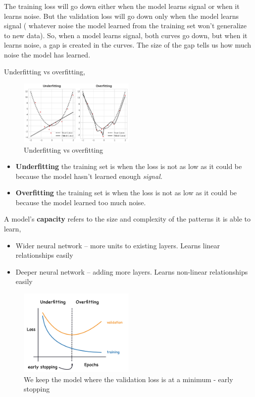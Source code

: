\noindent The training loss will go down either when the model learns signal or when it
learns noise. But the validation loss will go down only when the model learns signal (
whatever noise the model learned from the training set won't generalize to new data). So,
when a model learns signal, both curves go down, but when it learns noise, a gap is created
in the curves. The size of the gap tells us how much noise the model has learned.

\noindent Underfitting vs overfitting,

\begin{figure}[htp]
	\centering
	\includegraphics[width=0.5\textwidth]{../assets/machine_learning_random/underfitting_vs_overfitting.png}
	\caption{Underfitting vs overfitting}
\end{figure}

\begin{itemize}
	\item \textbf{Underfitting} the training set is when the loss is not as
		low as it could be because the model hasn't learned enough \emph{signal.}
	\item \textbf{Overfitting} the training set is when the loss is not as low
		as it could be because the model learned too much noise.
\end{itemize}

\noindent A model's \textbf{capacity} refers to the size and complexity of the patterns
it is able to learn,
\begin{itemize}
	\item Wider neural network -- more units to existing layers. Learns linear
		relationships easily
	\item Deeper neural network -- adding more layers. Learns non-linear
		relationships easily
\end{itemize}

\begin{figure}[htp]
	\centering
	\includegraphics[width=0.5\textwidth]{../assets/machine_learning_random/early_stopping.png}
	\caption{We keep the model where the validation loss is at a minimum - early stopping}
\end{figure}



